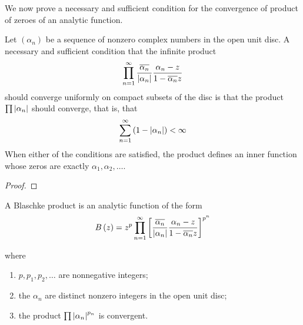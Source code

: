 We now prove a necessary and sufficient condition for the convergence of product of zeroes of an analytic function.

\begin{theorem}
    Let $\left( \alpha_{n} \right)$ be a sequence of nonzero complex numbers in the open unit disc. A necessary and sufficient condition that the infinite product 
    \begin{equation*}
	\prod_{n=1}^{\infty} \frac{\overline{\alpha_{n}}}{\left\lvert \alpha_{n} \right\rvert} \frac{\alpha_{n} - z}{ 1- \overline{\alpha_{n}}z}
    \end{equation*}
    should converge uniformly on compact subsets of the disc is that the product $\prod \left\lvert \alpha_{n} \right\rvert$ should converge, that is, that 
    \begin{equation*}
	\sum_{n=1}^{\infty} \left( 1-\left\lvert \alpha_{n} \right\rvert \right) < \infty
    \end{equation*}
    When either of the conditions are satisfied, the product defines an inner function whose zeros are exactly $\alpha_{1}, \alpha_{2}, \ldots$.
\end{theorem}
\begin{proof}
\end{proof}

\begin{definition}
    A Blaschke product is an analytic function of the form
    \begin{equation*}
	B\left( z \right) = z^{p} \prod_{n=1}^{\infty} \left[ \frac{\overline{\alpha_{n}}}{\left\lvert \alpha_{n} \right\rvert} \frac{\alpha_{n}-z}{1-\overline{\alpha_{n}}z} \right]^{p^{n}}
    \end{equation*}

    where
    \begin{enumerate}[label=(\roman*)]
	\item $p, p_{1}, p_{2}, \ldots$ are nonnegative integers;
	\item the $\alpha_{n}$ are distinct nonzero integers in the open unit disc;
	\item the product $\prod \left\lvert \alpha_{n} \right\rvert^{p_{n}}$ is convergent.
    \end{enumerate}
    \label{def:blaschke-product}
\end{definition}

